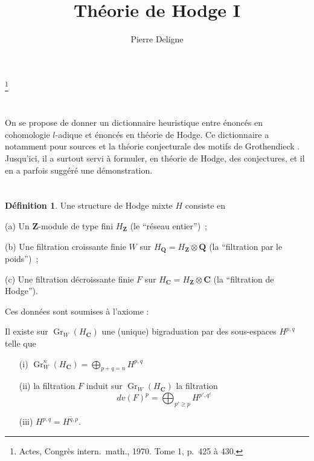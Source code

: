 \documentclass[12pt]{amsart}
\theoremstyle{definition}
\newtheorem{definition}{Définition}[section]
\DeclareMathOperator{\Gr}{Gr}
\newcommand{\Q}{\mathbf{Q}}
\newcommand{\Z}{\mathbf{Z}}
\newcommand{\C}{\mathbf{C}}
\begin{document}
\title{Théorie de Hodge I}
\author{Pierre Deligne}
\address{I.H.E.S.\\35, route de Chartres\\91-Bures-sur-Yvette (France)}
\thanks{Actes, Congr\`es intern.\ math., 1970. Tome 1, p.\ 425 \`a 430.}
\maketitle

\section*{}

On se propose de donner un dictionnaire heuristique entre énoncés en cohomologie
$l$-adique et énoncés en théorie de Hodge. Ce dictionnaire a notamment pour sources \cite{Serre} et la théorie conjecturale des motifs de Grothendieck \cite{Demazure}. Jusqu'ici, il a surtout servi à formuler, en théorie de Hodge, des conjectures, et il en a parfois suggéré une démonstration.

\section{}

\begin{definition}\label{def1.1}
Une structure de Hodge mixte $H$ consiste en

\textup{(a)} Un $\Z$-module de type fini $H_{\Z}$ (le ``réseau entier'')~;

\textup{(b)} Une filtration croissante finie $W$ sur $H_{\Q} = H_{\Z} \otimes \Q$ (la ``filtration par le poids'')~;

\textup{(c)} Une filtration décroissante finie $F$ sur $H_{\C} = H_{\Z} \otimes \C$ (la ``filtration de Hodge'').

Ces données sont soumises à l'axiome :

Il existe sur $\Gr_{W}(H_{\C})$ une (unique) bigraduation par des sous-espaces $H^{p,q}$ telle que
\begin{enumerate}
\item[(i)] $\displaystyle \Gr_{W}^{n}(H_{\C}) = \bigoplus_{p+q=n} H^{p,q}$
\item[(ii)] la filtration $F$ induit sur $\Gr_{W}(H_{\C})$ la filtration
\[
dv(F)^{p} = \bigoplus_{p' \geqslant p} H^{p',q'}
\]
\item[(iii)] $H^{p,q} = \overline{H^{q,p}}$.
\end{enumerate}
\end{definition}
\end{document}
